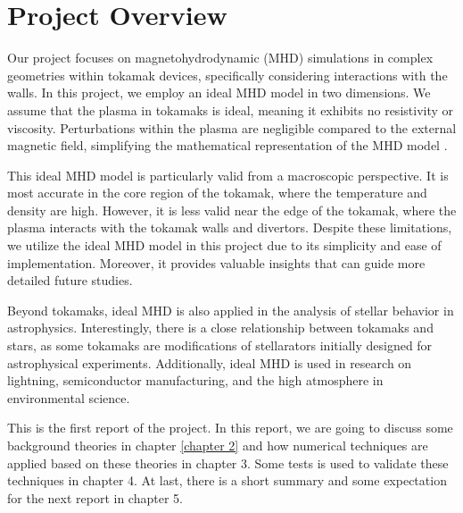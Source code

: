 \section{Project Overview}
Our project focuses on magnetohydrodynamic (MHD) simulations in complex geometries within tokamak devices, specifically considering interactions with the walls. In this project, we employ an ideal MHD model in two dimensions. We assume that the plasma in tokamaks is ideal, meaning it exhibits no resistivity or viscosity. Perturbations within the plasma are negligible compared to the external magnetic field, simplifying the mathematical representation of the MHD model \cite{moynihan2023fusion}.

This ideal MHD model is particularly valid from a macroscopic perspective. It is most accurate in the core region of the tokamak, where the temperature and density are high. However, it is less valid near the edge of the tokamak, where the plasma interacts with the tokamak walls and divertors. Despite these limitations, we utilize the ideal MHD model in this project due to its simplicity and ease of implementation. Moreover, it provides valuable insights that can guide more detailed future studies.

Beyond tokamaks, ideal MHD is also applied in the analysis of stellar behavior in astrophysics. Interestingly, there is a close relationship between tokamaks and stars, as some tokamaks are modifications of stellarators initially designed for astrophysical experiments. Additionally, ideal MHD is used in research on lightning, semiconductor manufacturing, and the high atmosphere in environmental science.

This is the first report of the project. In this report, we are going to discuss some background theories in chapter \ref{chapter 2} and how numerical techniques are applied based on these theories in chapter 3. Some tests is used to validate these techniques in chapter 4. At last, there is a short summary and some expectation for the next report in chapter 5.

